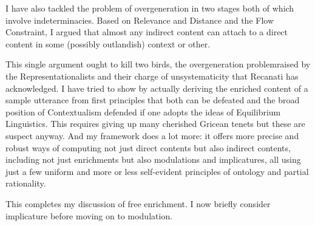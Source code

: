 I have also tackled the problem of overgeneration in two stages both of which involve indeterminacies. Based on Relevance and Distance and the Flow Constraint, I argued that almost any indirect content can attach to a direct content in some (possibly outlandish) context or other. 


This single argument ought to kill two birds, the overgeneration problem\linebreak raised by the Representationalists and their charge of unsystematicity that Recanati has acknowledged. I have tried to show by actually deriving the enriched content of a sample utterance from first principles that both can be defeated and the broad position of Contextualism defended if one adopts the ideas of Equilibrium Linguistics. This requires giving up many cherished Gricean tenets but these are suspect anyway. And my framework does a lot more: it offers more precise and robust ways of computing not just direct contents but also indirect contents, including not just enrichments but also modulations and implicatures, all using just a few uniform and more or less self-evident principles of ontology and partial rationality.

This completes my discussion of free enrichment. I now briefly consider implicature before moving on to modulation.


